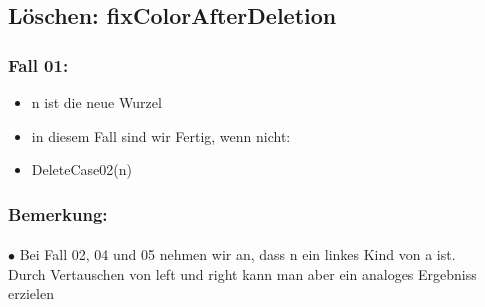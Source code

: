 	\subsection{Löschen: fixColorAfterDeletion}
		\begin{minipage}[t]{0.5\textwidth}
			\subsubsection{Fall 01:}
				\begin{itemize}
					\item n ist die neue Wurzel
					\item in diesem Fall sind wir Fertig, wenn nicht:
					\item DeleteCase02(n)
				\end{itemize}
		\end{minipage}
		\hspace{2cm}
		\begin{minipage}[t]{0.35\textwidth}
			\subsubsection{Bemerkung:}
				\paragraph{} $\bullet$ Bei Fall 02, 04 und 05 nehmen wir an, dass n ein linkes Kind von a ist. \\
				\mbox{} \hspace{0.3cm} Durch Vertauschen von left und right kann man aber ein analoges Ergebniss erzielen
		\end{minipage}
		\vspace{0.9cm}

		\centerline{\noindent\makebox[0.5\linewidth]{\rule{0.5\paperwidth}{0.4pt}}}
